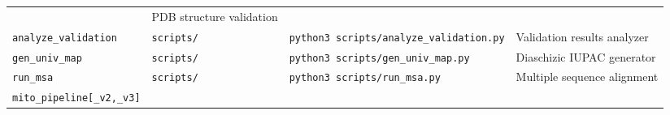 \documentclass[12pt,a4paper]{article}
\begin{document}
\begin{longtable}[]{@{}llll@{}}
\begin{minipage}[t]{0.19\columnwidth}
\end{minipage} & \begin{minipage}[t]{0.28\columnwidth}\raggedright
PDB structure validation\strut
\end{minipage}\tabularnewline
\begin{minipage}[t]{0.17\columnwidth}\raggedright
\texttt{analyze\_validation}\strut
\end{minipage} & \begin{minipage}[t]{0.24\columnwidth}\raggedright
\texttt{scripts/}\strut
\end{minipage} & \begin{minipage}[t]{0.19\columnwidth}\raggedright
\texttt{python3\ scripts/analyze\_validation.py}\strut
\end{minipage} & \begin{minipage}[t]{0.28\columnwidth}\raggedright
Validation results analyzer\strut
\end{minipage}\tabularnewline
\begin{minipage}[t]{0.17\columnwidth}\raggedright
\texttt{gen\_univ\_map}\strut
\end{minipage} & \begin{minipage}[t]{0.24\columnwidth}\raggedright
\texttt{scripts/}\strut
\end{minipage} & \begin{minipage}[t]{0.19\columnwidth}\raggedright
\texttt{python3\ scripts/gen\_univ\_map.py}\strut
\end{minipage} & \begin{minipage}[t]{0.28\columnwidth}\raggedright
Diaschizic IUPAC generator\strut
\end{minipage}\tabularnewline
\begin{minipage}[t]{0.17\columnwidth}\raggedright
\texttt{run\_msa}\strut
\end{minipage} & \begin{minipage}[t]{0.24\columnwidth}\raggedright
\texttt{scripts/}\strut
\end{minipage} & \begin{minipage}[t]{0.19\columnwidth}\raggedright
\texttt{python3\ scripts/run\_msa.py}\strut
\end{minipage} & \begin{minipage}[t]{0.28\columnwidth}\raggedright
Multiple sequence alignment\strut
\end{minipage}\tabularnewline
\begin{minipage}[t]{0.17\columnwidth}\raggedright
\texttt{mito\_pipeline{[}\_v2,\_v3{]}}\strut
\end{minipage} & \begin{minipage}[t]{0.24\columnwidth}\raggedright

\end{minipage}
\end{longtable}
\end{document}
